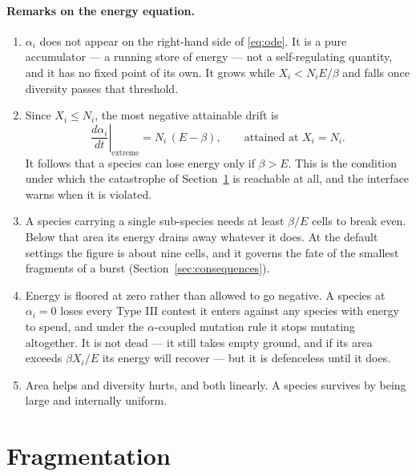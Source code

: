 \documentclass[11pt,a4paper]{article}
\begin{document}
\paragraph{Remarks on the energy equation.}
\begin{enumerate}[label=(\roman*),itemsep=3pt]
  \item $\alpha_i$ does not appear on the right-hand side of \eqref{eq:ode}. It is a pure
        accumulator --- a running store of energy --- not a self-regulating quantity, and
        it has no fixed point of its own. It grows while $X_i < N_i E / \beta$ and falls
        once diversity passes that threshold.
  \item Since $X_i \le N_i$, the most negative attainable drift is
        \begin{equation}
          \left.\frac{d\alpha_i}{dt}\right|_{\text{extreme}} = N_i\,(E - \beta),
          \qquad \text{attained at } X_i = N_i .
        \end{equation}
        It follows that a species can lose energy only if $\beta > E$. This is the
        condition under which the catastrophe of Section~\ref{sec:fragment} is reachable
        at all, and the interface warns when it is violated.
  \item A species carrying a single sub-species needs at least $\beta/E$ cells to break
        even. Below that area its energy drains away whatever it does. At the default
        settings the figure is about nine cells, and it governs the fate of the smallest
        fragments of a burst (Section~\ref{sec:consequences}).
  \item Energy is floored at zero rather than allowed to go negative. A species at
        $\alpha_i = 0$ loses every Type III contest it enters against any species with
        energy to spend, and under the $\alpha$-coupled mutation rule it stops mutating
        altogether. It is not dead --- it still takes empty ground, and if its area
        exceeds $\beta X_i / E$ its energy will recover --- but it is defenceless until
        it does.
  \item Area helps and diversity hurts, and both linearly. A species survives by being
        large and internally uniform.
\end{enumerate}

\section{Fragmentation}
\label{sec:fragment}
\end{document}
